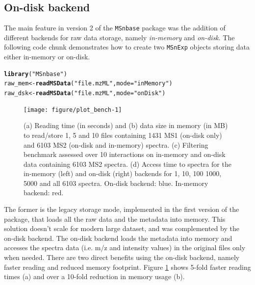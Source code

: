 \documentclass[journal=jacsat,manuscript=article]{achemso}\usepackage[]{graphicx}\usepackage[]{color}
\makeatletter
\newcommand{\hlstr}[1]{\textcolor[rgb]{0.192,0.494,0.8}{#1}}%
\newcommand{\hlstd}[1]{\textcolor[rgb]{0.345,0.345,0.345}{#1}}%
\newcommand{\hlkwb}[1]{\textcolor[rgb]{0.69,0.353,0.396}{#1}}%
\newcommand{\hlkwc}[1]{\textcolor[rgb]{0.333,0.667,0.333}{#1}}%
\newcommand{\hlkwd}[1]{\textcolor[rgb]{0.737,0.353,0.396}{\textbf{#1}}}%
\newenvironment{kframe}{%
 \def\at@end@of@kframe{}%
 \ifinner\ifhmode%
  \def\at@end@of@kframe{\end{minipage}}%
  \begin{minipage}{\columnwidth}%
 \fi\fi%
 \def\FrameCommand##1{\hskip\@totalleftmargin \hskip-\fboxsep
 \colorbox{shadecolor}{##1}\hskip-\fboxsep
     \hskip-\linewidth \hskip-\@totalleftmargin \hskip\columnwidth}%
 \MakeFramed {\advance\hsize-\width
   \@totalleftmargin\z@ \linewidth\hsize
   \@setminipage}}%
 {\par\unskip\endMakeFramed%
 \at@end@of@kframe}
\newenvironment{knitrout}{}{} %
\makeatother
\begin{document}
\subsection{On-disk backend}

The main feature in version 2 of the \texttt{MSnbase} package was the
addition of different backends for raw data storage, namely
\textit{in-memory} and \textit{on-disk}. The following code chunk
demonstrates how to create two \texttt{MSnExp} objects storing data
either in-memory or on-disk.

\begin{knitrout}
\color{fgcolor}\begin{kframe}
\begin{alltt}
\hlkwd{library}\hlstd{(}\hlstr{"MSnbase"}\hlstd{)}
\hlstd{raw_mem} \hlkwb{<-} \hlkwd{readMSData}\hlstd{(}\hlstr{"file.mzML"}\hlstd{,} \hlkwc{mode} \hlstd{=} \hlstr{"inMemory"}\hlstd{)}
\hlstd{raw_dsk} \hlkwb{<-} \hlkwd{readMSData}\hlstd{(}\hlstr{"file.mzML"}\hlstd{,} \hlkwc{mode} \hlstd{=} \hlstr{"onDisk"}\hlstd{)}
\end{alltt}
\end{kframe}
\end{knitrout}







\begin{figure}[p]
  \centering
\begin{knitrout}
\color{fgcolor}
\texttt{[image: figure/plot\_bench-1]} 

\end{knitrout}
\caption{(a) Reading time (in seconds) and (b) data size in memory (in
  MB) to read/store 1, 5 and 10 files containing 1431 MS1 (on-disk
  only) and 6103 MS2 (on-disk and in-memory) spectra. (c) Filtering
  benchmark assessed over 10 interactions on in-memory and on-disk data
  containing 6103 MS2 spectra.  (d) Access time to spectra for the
  in-memory (left) and on-disk (right) backends for 1, 10, 100 1000,
  5000 and all 6103 spectra. On-disk backend: blue. In-memory backend:
  red. }
\label{fig:bench}
\end{figure}


The former is the legacy storage mode, implemented in the first
version of the package, that loads all the raw data and the metadata
into memory. This solution doesn't scale for modern large dataset, and
was complemented by the on-disk backend. The on-disk backend loads the
metadata into memory and accesses the spectra data (i.e. m/z and
intensity values) in the original files only when needed. There are
two direct benefits using the on-disk backend, namely faster reading
and reduced memory footprint. Figure \ref{fig:bench} shows 5-fold
faster reading times (a) and over a 10-fold reduction in memory usage
(b).
\end{document}

